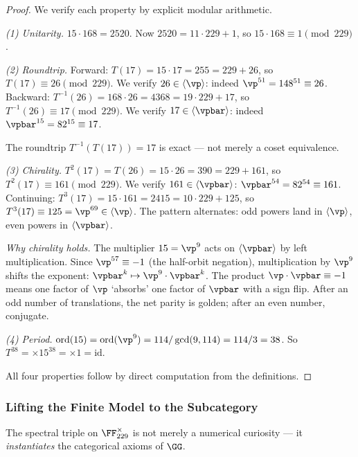 \begin{proof}
We verify each property by explicit modular arithmetic.

\emph{(1) Unitarity.} $15 \cdot 168 = 2520$. Now $2520 = 11 \cdot 229 + 1$, so $15 \cdot 168 \equiv 1 \pmod{229}$.

\emph{(2) Roundtrip.} Forward: $T(17) = 15 \cdot 17 = 255 = 229 + 26$, so $T(17) \equiv 26 \pmod{229}$. We verify $26 \in \langle\vp\rangle$: indeed $\vp^{51} = 148^{51} \equiv 26$. Backward: $T^{-1}(26) = 168 \cdot 26 = 4368 = 19 \cdot 229 + 17$, so $T^{-1}(26) \equiv 17 \pmod{229}$. We verify $17 \in \langle\vpbar\rangle$: indeed $\vpbar^{15} = 82^{15} \equiv 17$.

The roundtrip $T^{-1}(T(17)) = 17$ is exact --- not merely a coset equivalence.

\emph{(3) Chirality.} $T^2(17) = T(26) = 15 \cdot 26 = 390 = 229 + 161$, so $T^2(17) \equiv 161 \pmod{229}$. We verify $161 \in \langle\vpbar\rangle$: $\vpbar^{54} = 82^{54} \equiv 161$. Continuing: $T^3(17) = 15 \cdot 161 = 2415 = 10 \cdot 229 + 125$, so $T^3(17) \equiv 125 = \vp^{69} \in \langle\vp\rangle$. The pattern alternates: odd powers land in $\langle\vp\rangle$, even powers in $\langle\vpbar\rangle$.

\emph{Why chirality holds.} The multiplier $15 = \vp^9$ acts on $\langle\vpbar\rangle$ by left multiplication. Since $\vp^{57} \equiv -1$ (the half-orbit negation), multiplication by $\vp^9$ shifts the exponent: $\vpbar^k \mapsto \vp^9 \cdot \vpbar^k$. The product $\vp \cdot \vpbar \equiv -1$ means one factor of $\vp$ `absorbs' one factor of $\vpbar$ with a sign flip. After an odd number of translations, the net parity is golden; after an even number, conjugate.

\emph{(4) Period.} $\mathrm{ord}(15) = \mathrm{ord}(\vp^9) = 114 / \gcd(9, 114) = 114/3 = 38$. So $T^{38} = \times 15^{38} = \times 1 = \mathrm{id}$.

All four properties follow by direct computation from the definitions. \qedhere
\end{proof}

\subsubsection*{Lifting the Finite Model to the Subcategory}

The spectral triple on $\FF_{229}^\times$ is not merely a numerical curiosity --- it \emph{instantiates} the categorical axioms of $\GG$.

